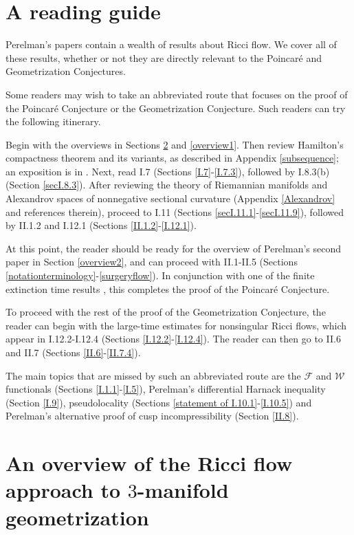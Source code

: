 \tableofcontents


\section{A reading guide}

Perelman's papers contain a wealth of results about Ricci flow.
We cover all of these results, whether or not they
are directly relevant to the Poincar\'e and Geometrization Conjectures.

Some readers may wish to take an abbreviated route that
focuses on the proof of the
Poincar\'e Conjecture or the Geometrization Conjecture.
Such readers can try the following itinerary.

Begin with the overviews in Sections \ref{overview0} and \ref{overview1}.
Then review Hamilton's compactness theorem and its variants, as described in
Appendix \ref{subsequence}; an exposition is in
\cite[Chapter 7]{Topping}.
Next, read I.7 (Sections \ref{I.7}-\ref{I.7.3}),
followed by I.8.3(b) (Section \ref{secI.8.3}).
After reviewing the theory of Riemannian
manifolds and Alexandrov spaces of nonnegative sectional curvature
(Appendix \ref{Alexandrov} and references therein),
proceed to I.11 (Sections \ref{secI.11.1}-\ref{secI.11.9}), followed by
II.1.2 and I.12.1 (Sections \ref{II.1.2}-\ref{I.12.1}).


At this point, the reader should be ready for
the overview of Perelman's second paper in Section \ref{overview2},  and
can proceed with II.1-II.5 (Sections
\ref{notationterminology}-\ref{surgeryflow}).  In conjunction with
one of the finite extinction time results
\cite{Colding-Minicozzi,Colding-Minicozzi2,Perelman3},
this completes the proof of the Poincar\'e Conjecture.

To proceed with the rest of the proof of the Geometrization Conjecture,
the reader can begin with the large-time estimates for nonsingular
Ricci flows, which appear in I.12.2-I.12.4
(Sections \ref{I.12.2}-\ref{I.12.4}).
The reader can then go to II.6 and II.7 (Sections \ref{II.6}-\ref{II.7.4}).

The main topics that are missed by such an abbreviated route are
the ${\mathcal F}$ and ${\mathcal W}$ functionals
(Sections \ref{I.1.1}-\ref{I.5}), Perelman's differential Harnack inequality
(Section \ref{I.9}),  pseudolocality (Sections
\ref{statement of I.10.1}-\ref{I.10.5}) and Perelman's alternative proof
of cusp incompressibility (Section \ref{II.8}).




\section{An overview of the Ricci flow approach to
$3$-manifold geometrization}
\label{overview0}

